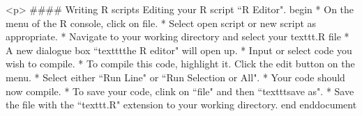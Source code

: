 <p>
#### {Writing R scripts}
Editing your R script ``R Editor".
begin{ }
         * On the menu of the R console, click on file.
         * Select open script or new script as appropriate.
         * Navigate to your working directory and select your texttt{.R} file
         * A new dialogue box ``texttt{the R editor}" will open up.
         * Input or select code you wish to compile.
         * To compile this code, highlight it. Click the edit button on the menu.
         * Select either ``Run Line" or ``Run Selection or All".
         * Your code should now compile.
         * To save your code, clink on ``file" and then ``texttt{save as}".
         * Save the file with the ``texttt{.R}" extension to your working directory.
end{ }
end{document}
